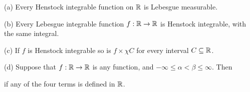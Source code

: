  (a) Every Henstock integrable function on
$\Bbb R$ is Lebesgue measurable.

(b) Every Lebesgue integrable function $f:\Bbb R\to\Bbb R$ is Henstock
integrable, with the same integral.

(c) If $f$ is Henstock integrable so is $f\times\chi C$ for every
interval $C\subseteq\Bbb R$.

(d) Suppose that $f:\Bbb R\to\Bbb R$ is any function, and
$-\infty\le\alpha<\beta\le\infty$.   Then


\noindent if any of the four terms is defined in $\Bbb R$.

